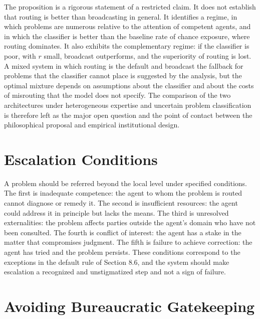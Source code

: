 \documentclass[11pt]{report}
\theoremstyle{definition}
\theoremstyle{remark}
\begin{document}
The proposition is a rigorous statement of a restricted claim. It does not establish that routing is better than broadcasting in general. It identifies a regime, in which problems are numerous relative to the attention of competent agents, and in which the classifier is better than the baseline rate of chance exposure, where routing dominates. It also exhibits the complementary regime: if the classifier is poor, with $r$ small, broadcast outperforms, and the superiority of routing is lost. A mixed system in which routing is the default and broadcast the fallback for problems that the classifier cannot place is suggested by the analysis, but the optimal mixture depends on assumptions about the classifier and about the costs of misrouting that the model does not specify. The comparison of the two architectures under heterogeneous expertise and uncertain problem classification is therefore left as the major open question and the point of contact between the philosophical proposal and empirical institutional design.

\section{Escalation Conditions}

A problem should be referred beyond the local level under specified conditions. The first is inadequate competence: the agent to whom the problem is routed cannot diagnose or remedy it. The second is insufficient resources: the agent could address it in principle but lacks the means. The third is unresolved externalities: the problem affects parties outside the agent's domain who have not been consulted. The fourth is conflict of interest: the agent has a stake in the matter that compromises judgment. The fifth is failure to achieve correction: the agent has tried and the problem persists. These conditions correspond to the exceptions in the default rule of Section 8.6, and the system should make escalation a recognized and unstigmatized step and not a sign of failure.

\section{Avoiding Bureaucratic Gatekeeping}
\end{document}
